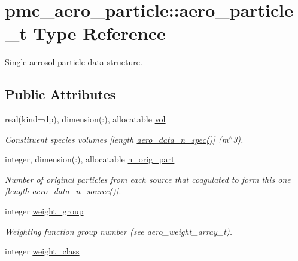 \hypertarget{structpmc__aero__particle_1_1aero__particle__t}{}\section{pmc\+\_\+aero\+\_\+particle\+:\+:aero\+\_\+particle\+\_\+t Type Reference}
\label{structpmc__aero__particle_1_1aero__particle__t}


Single aerosol particle data structure.  


\subsection*{Public Attributes}
\begin{DoxyCompactItemize}
\item 
real(kind=dp), dimension(\+:), allocatable \mbox{\hyperlink{structpmc__aero__particle_1_1aero__particle__t_a23a9bef33b970faf835e0b63c20d4177}{vol}}
\begin{DoxyCompactList}\small\item\em Constituent species volumes \mbox{[}length \mbox{\hyperlink{namespacepmc__aero__data_a0ad6e20bd94def8cbbcac7dda7ec3089}{aero\+\_\+data\+\_\+n\+\_\+spec()}}\mbox{]} (m$^\wedge$3). \end{DoxyCompactList}\item 
integer, dimension(\+:), allocatable \mbox{\hyperlink{structpmc__aero__particle_1_1aero__particle__t_a6d32b24a475c8c29d9dd0a2bc41e5e95}{n\+\_\+orig\+\_\+part}}
\begin{DoxyCompactList}\small\item\em Number of original particles from each source that coagulated to form this one \mbox{[}length \mbox{\hyperlink{namespacepmc__aero__data_a270b6c2baba361257005658bc293ecde}{aero\+\_\+data\+\_\+n\+\_\+source()}}\mbox{]}. \end{DoxyCompactList}\item 
integer \mbox{\hyperlink{structpmc__aero__particle_1_1aero__particle__t_a6b670aeae68fba7b99128b0a4d8cafb5}{weight\+\_\+group}}
\begin{DoxyCompactList}\small\item\em Weighting function group number (see {\ttfamily aero\+\_\+weight\+\_\+array\+\_\+t}). \end{DoxyCompactList}\item 
integer \mbox{\hyperlink{structpmc__aero__particle_1_1aero__particle__t_a65ef4cd1fde6f14647bb28b7d10340a3}{weight\+\_\+class}}

\end{DoxyCompactItemize}
